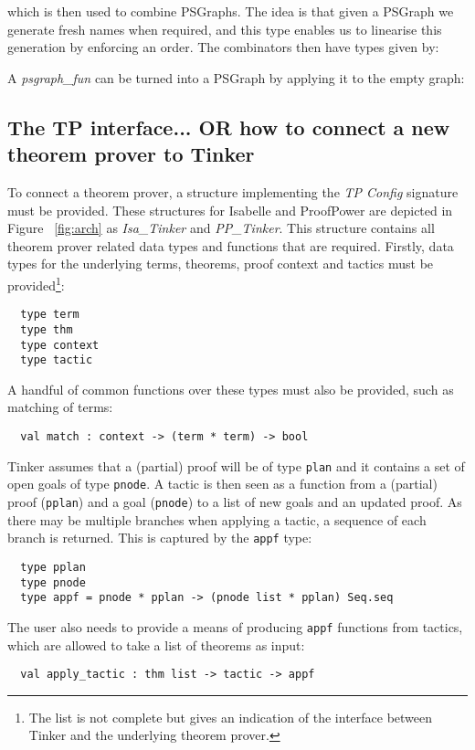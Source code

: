 \documentclass[submission,copyright,creativecommons]{eptcs}
\begin{document}
which is then used to combine PSGraphs. The idea is that given a PSGraph we generate fresh names when required, and this type enables us to linearise this generation by enforcing an order. The combinators then have types given by:


A \textit{psgraph\_fun} can be turned into a PSGraph by applying it to the empty graph:



\subsection{The TP interface... OR how to connect a new theorem prover to Tinker}

To connect a theorem prover, a structure implementing the \emph{TP Config} signature must be provided. These structures for Isabelle and ProofPower are depicted in Figure ~\ref{fig:arch} as \emph{Isa\_Tinker} and \emph{PP\_Tinker}. This structure contains all theorem prover related data types and functions that are required. Firstly, data types for the underlying terms, theorems, proof context and tactics must be provided\footnote{The list is not complete but gives an indication of the interface between Tinker and the underlying theorem prover.}:
\begin{verbatim}
  type term 
  type thm
  type context
  type tactic 
\end{verbatim}
A handful of common functions over these types must also be provided, such as matching of terms:
\begin{verbatim}
  val match : context -> (term * term) -> bool
\end{verbatim}
Tinker assumes that a (partial) proof will be of type \texttt{plan} and it contains a set of open goals of type \texttt{pnode}. A tactic
is then seen as a function from a (partial) proof (\texttt{pplan}) and a goal (\texttt{pnode}) to a list of new goals and 
an updated proof. As there may be multiple branches when applying a tactic, a sequence of each branch is returned. This is captured by 
the \texttt{appf} type:
\begin{verbatim}
  type pplan
  type pnode
  type appf = pnode * pplan -> (pnode list * pplan) Seq.seq
\end{verbatim}
The user also needs to provide a means of producing \texttt{appf} functions from tactics, which are allowed to take a list of theorems as input:
\begin{verbatim}
  val apply_tactic : thm list -> tactic -> appf
\end{verbatim}
\end{document}
